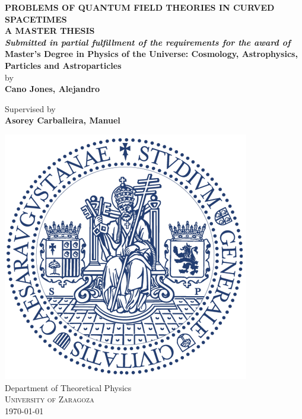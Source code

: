 \begin{titlepage}
	\vspace*{0.5cm}
	\begin{center}
		
		\Large \textbf {PROBLEMS OF QUANTUM FIELD THEORIES IN CURVED SPACETIMES}\\[0.8in]
		
		\vspace*{-0.5cm}
		\normalsize
		\textbf{A MASTER THESIS}\\[0.1in]
		\small
		\textit{\textbf{Submitted in partial fulfillment of
				the requirements for the award of }}\\[0.3in]
		
		\normalsize
		\textbf{Master's Degree in Physics of the Universe: Cosmology, Astrophysics, Particles and Astroparticles}\\[0.6in]
		\vspace*{-0.8cm}
		by \\
		\textbf{Cano Jones, Alejandro}
		
		
		
		
		\vspace{.3in}
		Supervised by\\
		{\textbf{Asorey Carballeira, Manuel}}\\[0.1in]
		
		\vfill
		
		\includegraphics[scale=0.3]{Images/Logos/Logo_Universidad.png}\\[0.1in]
		{Department of Theoretical Physics}\\
		\normalsize
		\textsc{University of Zaragoza}\\
		\today
		
	\end{center}
	
\end{titlepage}